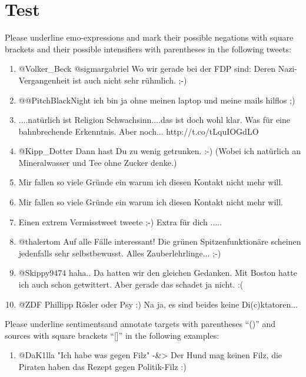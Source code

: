 \documentclass[12pt,fleqn]{scrreprt}
\begin{document}
\section*{Test}
\begin{enumerate}[I)]
  {\bfseries\item Please underline emo-expressions and mark their
    possible negations with square brackets and their possible
    intensifiers with parentheses in the following tweets:}
  \begin{enumerate}
  \item @Volker\_Beck @sigmargabriel Wo wir gerade bei der FDP sind:
    Deren Nazi-Vergangenheit ist auch nicht sehr r\"uhmlich. ;-)

  \item @@PitchBlackNight ich bin ja ohne meinen laptop und meine
    mails hilflos ;)

  \item ....nat\"urlich ist Religion Schwachsinn....das ist doch wohl
    klar. Was f\"ur eine bahnbrechende Erkenntnis. Aber
    noch... http://t.co/tLquIOGdLO

  \item @Kipp\_Dotter Dann hast Du zu wenig getrunken. :-) (Wobei ich
    nat\"urlich an Mineralwasser und Tee ohne Zucker denke.)

  \item Mir fallen so viele Gr\"unde ein warum ich diesen Kontakt
    nicht mehr will.

  \item Mir fallen so viele Gr\"unde ein warum ich diesen Kontakt
    nicht mehr will.

  \item Einen extrem Vermisstweet tweete ;-) Extra f\"ur dich .....

  \item @thalertom Auf alle F\"alle interessant! Die gr\"unen
    Spitzenfunktion\"are scheinen jedenfalls sehr selbstbewusst. Alles
    Zauberlehrlinge... ;-)

   \item @Skippy9474 haha.. Da hatten wir den gleichen Gedanken. Mit
     Boston hatte ich auch schon getwittert. Aber gerade das schadet
     ja nicht. :(

   \item @ZDF Phillipp R\"osler oder Psy :) Na ja, es sind beides
     keine Di(c)ktatoren...
  \end{enumerate}

  {\bfseries\item Please underline sentimentsand annotate targets with
    parentheses ``()'' and sources with square brackets ``[]'' in the
    following examples:}
  \begin{enumerate}
  \item @DaK1lla "Ich habe was gegen Filz" -\&> Der Hund mag
    keinen Filz, die Piraten haben das Rezept gegen Politik-Filz :)


\end{enumerate}
\end{enumerate}
\end{document}
